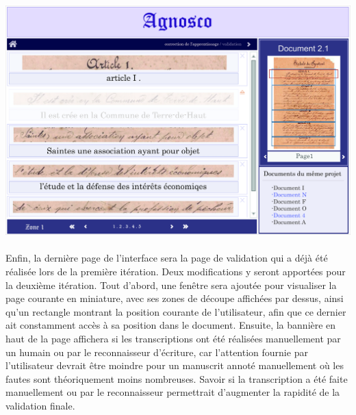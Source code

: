 \begin{mdframed}[frametitle={Figure 5 : Maquette de la page de visualisation des transcriptions du reconnaisseur}, innerbottommargin=10]
\begin{center}
\includegraphics[scale=0.04]{assets/maquetteIHMcorrectionIA.jpg}
\end{center}
\end{mdframed}

\paragraph{}
Enfin, la dernière page de l’interface sera la page de validation qui a déjà été réalisée lors de la première itération. Deux modifications y seront apportées pour la deuxième itération.
\newline{}
Tout d'abord, une fenêtre sera ajoutée pour visualiser la page courante en miniature, avec ses zones de découpe affichées par dessus, ainsi qu’un rectangle montrant la position courante de l’utilisateur, afin que ce dernier ait constamment accès à sa position dans le document.
\newline{}
Ensuite, la bannière en haut de la page affichera si les transcriptions ont été réalisées manuellement par un humain ou par le reconnaisseur d'écriture, car l'attention fournie par l'utilisateur devrait être moindre pour un manuscrit annoté manuellement où les fautes sont théoriquement moins nombreuses. Savoir si la transcription a été faite manuellement ou par le reconnaisseur permettrait d'augmenter la rapidité de la validation finale.

